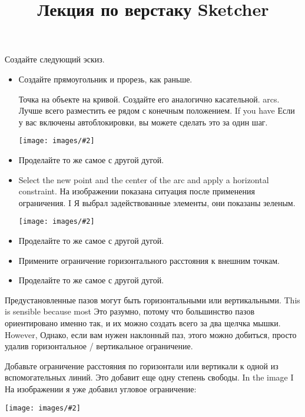 \documentclass[12pt,titlepage]{article}
\newcommand{\img}[2]{\vspace{2ex}\noindent\texttt{[image: images/\#2]}}
\begin{document}
Создайте следующий эскиз.
\begin{itemize}
\item Создайте прямоугольник и прорезь, как раньше.
\item [Точка на объекте на кривой.] Создайте его аналогично касательной.
      arcs. Лучше всего разместить ее рядом с конечным положением. If you have
      Если у вас включены автоблокировки, вы можете сделать это за один шаг.

\img{}{slotPointOnArc}
\item Проделайте то же самое с другой дугой.
\item Select the new point and the center of the arc and apply a horizontal
      constraint. На изображении показана ситуация после применения ограничения. I
      Я выбрал задействованные элементы, они показаны зеленым.

\img{}{slotPointOnArcAfter}
\item Проделайте то же самое с другой дугой.
\item Примените ограничение горизонтального расстояния к внешним точкам.
\item Проделайте то же самое с другой дугой.
\end{itemize}

\title{Лекция по верстаку Sketcher}
Предустановленные пазов могут быть горизонтальными или вертикальными. This is sensible because most
Это разумно, потому что большинство пазов ориентировано именно так, и их можно создать всего за два щелчка мышки. However,
Однако, если вам нужен наклонный паз, этого можно добиться, просто удалив горизонтальное / вертикальное ограничение.
\item Добавьте ограничение расстояния по горизонтали или вертикали к одной из вспомогательных линий. Это добавит еще одну степень свободы. In the image I
На изображении я уже добавил угловое ограничение:

\label{SlotTilted}
\img{}{SlotTilted}
\end{document}
